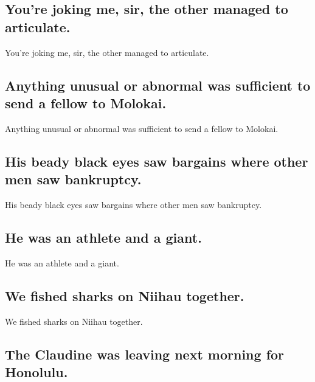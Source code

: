 \documentclass[]{article}
\begin{document}
\hypertarget{youre-joking-me-sir-the-other-managed-to-articulate.}{%
\subsection{You're joking me, sir, the other managed to
articulate.}\label{youre-joking-me-sir-the-other-managed-to-articulate.}}

You're joking me, sir, the other managed to articulate.

\hypertarget{anything-unusual-or-abnormal-was-sufficient-to-send-a-fellow-to-molokai.}{%
\subsection{Anything unusual or abnormal was sufficient to send a fellow
to
Molokai.}\label{anything-unusual-or-abnormal-was-sufficient-to-send-a-fellow-to-molokai.}}

Anything unusual or abnormal was sufficient to send a fellow to Molokai.

\hypertarget{his-beady-black-eyes-saw-bargains-where-other-men-saw-bankruptcy.}{%
\subsection{His beady black eyes saw bargains where other men saw
bankruptcy.}\label{his-beady-black-eyes-saw-bargains-where-other-men-saw-bankruptcy.}}

His beady black eyes saw bargains where other men saw bankruptcy.

\hypertarget{he-was-an-athlete-and-a-giant.}{%
\subsection{He was an athlete and a
giant.}\label{he-was-an-athlete-and-a-giant.}}

He was an athlete and a giant.

\hypertarget{we-fished-sharks-on-niihau-together.}{%
\subsection{We fished sharks on Niihau
together.}\label{we-fished-sharks-on-niihau-together.}}

We fished sharks on Niihau together.

\hypertarget{the-claudine-was-leaving-next-morning-for-honolulu.}{%
\subsection{The Claudine was leaving next morning for
Honolulu.}\label{the-claudine-was-leaving-next-morning-for-honolulu.}}
\end{document}
